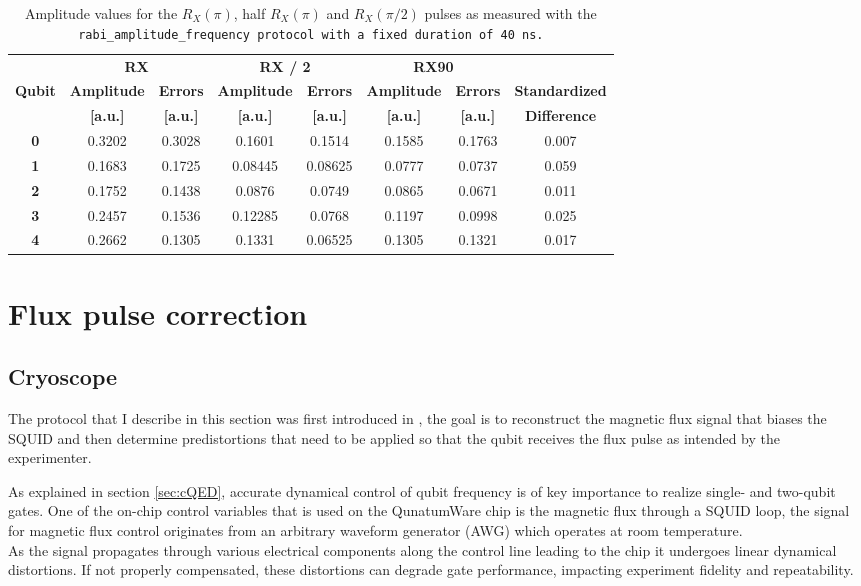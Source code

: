 \begin{table}[h!]
    \centering
    \begin{tabular}{c|cc|cc|cc|c}
        \toprule
         & \multicolumn{2}{c|}{\textbf{RX}} & \multicolumn{2}{c|}{\textbf{RX / 2}} & \multicolumn{2}{c|}{\textbf{RX90}} & \textbf{} \\
        \textbf{Qubit} & \textbf{Amplitude} & \textbf{Errors} & \textbf{Amplitude} & \textbf{Errors} & \textbf{Amplitude} & \textbf{Errors} & \textbf{Standardized} \\
         & \textbf{[a.u.]} & \textbf{[a.u.]} & \textbf{[a.u.]} & \textbf{[a.u.]} & \textbf{[a.u.]} & \textbf{[a.u.]} & \textbf{Difference}\\
        \midrule
        \textbf{0} & 0.3202 & 0.3028 & 0.1601 & 0.1514 & 0.1585 & 0.1763 & 0.007\\
        \textbf{1} & 0.1683 & 0.1725 & 0.08445 & 0.08625 & 0.0777 & 0.0737 & 0.059\\
        \textbf{2} & 0.1752 & 0.1438 & 0.0876 & 0.0749 & 0.0865 & 0.0671 & 0.011\\
        \textbf{3} & 0.2457 & 0.1536 & 0.12285 & 0.0768 & 0.1197 & 0.0998 & 0.025\\
        \textbf{4} & 0.2662 & 0.1305 & 0.1331 & 0.06525 & 0.1305 & 0.1321 & 0.017\\
        \bottomrule
    \end{tabular}
    \caption{Amplitude values for the $R_X(\pi)$, half $R_X(\pi)$ and $R_X(\pi/2)$ pulses as measured with the \tt{rabi\_amplitude\_frequency} protocol with a fixed duration of 40 ns.}
    \label{tab:af}
\end{table}

\newpage
\restoregeometry
\section{Flux pulse correction}

\subsection{Cryoscope}
The protocol that I describe in this section was first introduced in \cite{rol_time-domain_2020}, the goal is to reconstruct the magnetic flux signal that biases the SQUID and then determine predistortions that need to be applied so that the qubit receives the flux pulse as intended by the experimenter.

As explained in section \ref{sec:cQED}, accurate dynamical control of qubit frequency is of key importance to realize single- and two-qubit gates.
One of the on-chip control variables that is used on the QunatumWare chip is the magnetic flux through a SQUID loop, the signal for magnetic flux control originates from an arbitrary waveform generator (AWG) which operates at room temperature.\\
As the signal propagates through various electrical components along the control line leading to the chip it undergoes linear dynamical distortions. 
If not properly compensated, these distortions can degrade gate performance, impacting experiment fidelity and repeatability.\\

